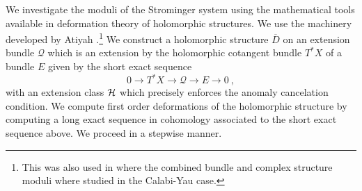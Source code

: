 \documentclass[12pt,a4paper]{article}
\def\bar#1{\overline{#1}}
\def\Q{\mathcal{Q}}
\theoremstyle{definition}
\begin{document}
We investigate the moduli of the Strominger system using the mathematical tools available in  deformation theory of holomorphic structures.
We use the machinery developed by Atiyah \cite{MR0086359}.\footnote{This was also  used in \cite{Anderson:2010mh} where the combined bundle and complex structure moduli where studied in the Calabi-Yau case.}  We construct a holomorphic structure $\bar D$ on an extension bundle $\Q$ which
is an extension by the holomorphic cotangent bundle $T^*X$ of a bundle $E$ given by the short exact sequence
\[ 0 \rightarrow T^*X \rightarrow \Q \rightarrow E \rightarrow 0~,\]
with an extension class $\cal H$ which precisely enforces the anomaly cancelation condition. We  compute first order deformations of the holomorphic structure by computing a long exact sequence in cohomology associated to the short exact sequence above.  We proceed in a stepwise manner.
\end{document}
